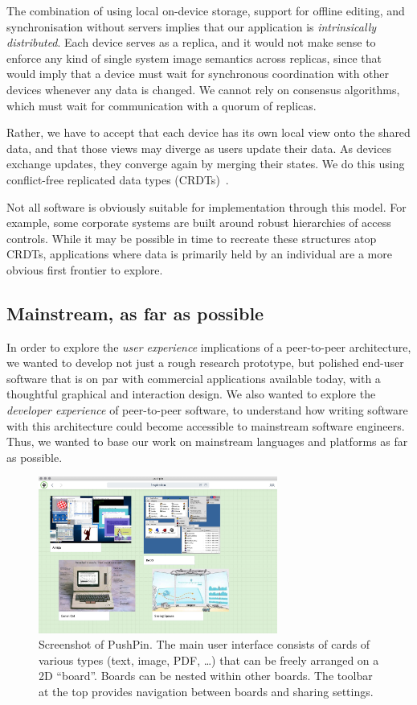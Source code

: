 \documentclass[sigplan,10pt]{acmart}
\begin{document}
The combination of using local on-device storage, support for offline editing, and synchronisation without servers implies that our application is \emph{intrinsically distributed}.
Each device serves as a replica, and it would not make sense to enforce any kind of single system image semantics across replicas, since that would imply that a device must wait for synchronous coordination with other devices whenever any data is changed.
We cannot rely on consensus algorithms, which must wait for communication with a quorum of replicas.

Rather, we have to accept that each device has its own local view onto the shared data, and that those views may diverge as users update their data.
As devices exchange updates, they converge again by merging their states.
We do this using conflict-free replicated data types (CRDTs)~\cite{Shapiro:2011un}.

Not all software is obviously suitable for implementation through this model. For example, some corporate systems are built around robust hierarchies of access controls. While it may be possible in time to recreate these structures atop CRDTs, applications where data is primarily held by an individual are a more obvious first frontier to explore.   

\subsection{Mainstream, as far as possible}

In order to explore the \emph{user experience} implications of a peer-to-peer architecture, we wanted to develop not just a rough research prototype, but polished end-user software that is on par with commercial applications available today, with a thoughtful graphical and interaction design.
We also wanted to explore the \emph{developer experience} of peer-to-peer software, to understand how writing software with this architecture could become accessible to mainstream software engineers.
Thus, we wanted to base our work on mainstream languages and platforms as far as possible.

\begin{figure}
    \centering
    \includegraphics[width=0.7\textwidth]{pushpin.jpg}
    \caption{Screenshot of PushPin. The main user interface consists of cards of various types (text, image, PDF, \dots) that can be freely arranged on a 2D ``board''. Boards can be nested within other boards. The toolbar at the top provides navigation between boards and sharing settings.}
    \label{fig:pushpin}
\end{figure}
\end{document}
